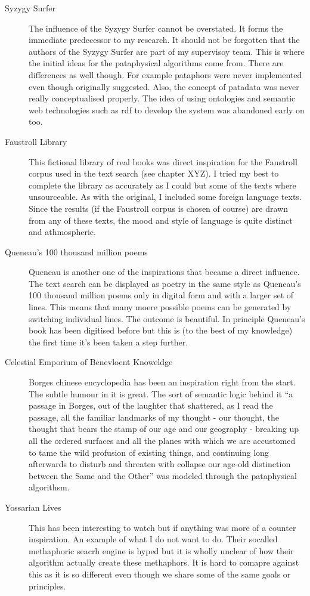 \begin{description}
  \item[Syzygy Surfer] The influence of the Syzygy Surfer cannot be overstated. It forms the immediate predecessor to my research. It should not be forgotten that the authors of the Syzygy Surfer are part of my supervisoy team. This is where the initial ideas for the pataphysical algorithms come from. There are differences as well though. For example pataphors were never implemented even though originally suggested. Also, the concept of patadata was never really conceptualised properly. The idea of using ontologies and semantic web technologies such as \gls{rdf} to develop the system was abandoned early on too.
  \item[Faustroll Library] This fictional library of real books was direct inspiration for the Faustroll corpus used in the text search (see chapter XYZ). I tried my best to complete the library as accurately as I could but some of the texts where unsourceable. As with the original, I included some foreign language texts. Since the results (if the Faustroll corpus is chosen of course) are drawn from any of these texts, the mood and style of language is quite distinct and athmospheric.
  \item[Queneau's 100 thousand million poems] Queneau is another one of the inspirations that became a direct influence. The text search can be displayed as poetry in the same style as Queneau's 100 thousand million poems only in digital form and with a larger set of lines. This means that many moere possible poems can be generated by switching individual lines. The outcome is beautiful. In principle Queneau's book has been digitised before but this is (to the best of my knowledge) the first time it's been taken a step further.
  \item[Celestial Emporium of Benevloent Knoweldge] Borges chinese encyclopedia has been an inspiration right from the start. The subtle humour in it is great. The sort of semantic logic behind it ``a passage in Borges, out of the laughter that shattered, as I read the passage, all the familiar landmarks of my thought - our thought, the thought that bears the stamp of our age and our geography - breaking up all the ordered surfaces and all the planes with which we are accustomed to tame the wild profusion of existing things, and continuing long afterwards to disturb and threaten with collapse our age-old distinction between the Same and the Other'' \autocite{Foucault1966} was modeled through the pataphysical algorithsm.
  \item[Yossarian Lives] This has been interesting to watch but if anything was more of a counter inspiration. An example of what I do not want to do. Their socalled methaphoric seacrh engine is hyped but it is wholly unclear of how their algorithm actually create these methaphors. It is hard to comapre against this as it is so different even though we share some of the same goals or principles.

\end{description}
